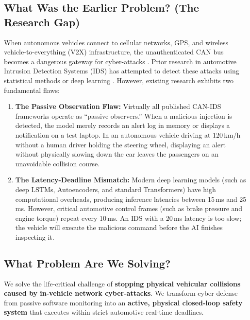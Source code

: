 \documentclass[conference]{IEEEtran}
\begin{document}
\subsection{What Was the Earlier Problem? (The Research Gap)}
When autonomous vehicles connect to cellular networks, GPS, and wireless vehicle-to-everything (V2X) infrastructure, the unauthenticated CAN bus becomes a dangerous gateway for cyber-attacks \cite{miller2015remote}. Prior research in automotive Intrusion Detection Systems (IDS) has attempted to detect these attacks using statistical methods or deep learning \cite{kang2016novel, song2020invehicle, tariq2021canadf}. However, existing research exhibits two fundamental flaws:
\begin{enumerate}
    \item \textbf{The Passive Observation Flaw:} Virtually all published CAN-IDS frameworks operate as ``passive observers.'' When a malicious injection is detected, the model merely records an alert log in memory or displays a notification on a test laptop. In an autonomous vehicle driving at 120\,km/h without a human driver holding the steering wheel, displaying an alert without physically slowing down the car leaves the passengers on an unavoidable collision course.
    \item \textbf{The Latency-Deadline Mismatch:} Modern deep learning models (such as deep LSTMs, Autoencoders, and standard Transformers) have high computational overheads, producing inference latencies between 15\,ms and 25\,ms. However, critical automotive control frames (such as brake pressure and engine torque) repeat every 10\,ms. An IDS with a 20\,ms latency is too slow; the vehicle will execute the malicious command before the AI finishes inspecting it.
\end{enumerate}

\subsection{What Problem Are We Solving?}
We solve the life-critical challenge of \textbf{stopping physical vehicular collisions caused by in-vehicle network cyber-attacks}. We transform cyber defense from passive software monitoring into an \textbf{active, physical closed-loop safety system} that executes within strict automotive real-time deadlines.
\end{document}
